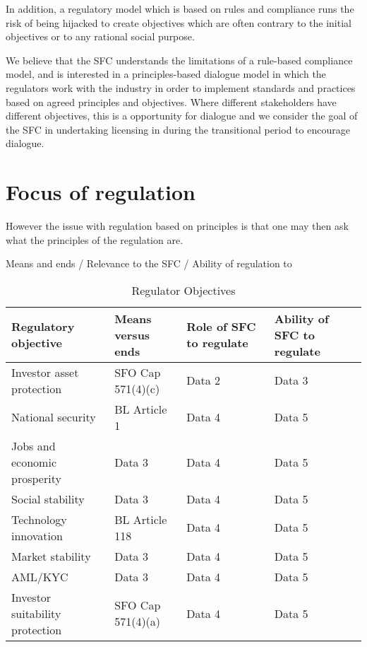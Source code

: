 In addition, a regulatory model which is based on rules and compliance
runs the risk of being hijacked to create objectives which are often
contrary to the initial objectives or to any rational social purpose.

We believe that the SFC understands the limitations of a rule-based
compliance model, and is interested in a principles-based dialogue
model in which the regulators work with the industry in order to
implement standards and practices based on agreed principles and
objectives.  Where different stakeholders have different objectives,
this is a opportunity for dialogue and we consider the goal of the SFC
in undertaking licensing in during the transitional period to
encourage dialogue.


\section{Focus of regulation}

However the issue with regulation based on principles is that one may
then ask what the principles of the regulation are.


Means and ends / Relevance to the SFC / Ability of regulation to 
\begin{landscape}
\thispagestyle{empty} %

\begin{table}[htbp]
  \centering
  \caption{Regulator Objectives}
  \begin{tabularx}{\linewidth}{|X|X|X|X|}
    \hline
    \textbf{Regulatory objective} & \textbf{Means versus ends} & \textbf{Role of SFC to regulate} & \textbf{Ability of SFC to regulate} \\
    \hline
    Investor asset protection & SFO Cap 571(4)(c) & Data 2 & Data 3 \\
    \hline
    National security & BL Article 1 & Data 4  & Data 5\\
    \hline
    Jobs and economic prosperity & Data 3 & Data 4  & Data 5\\
    \hline
    Social stability & Data 3 & Data 4  & Data 5\\
    \hline
    Technology innovation & BL Article 118 & Data 4  & Data 5\\
    \hline
    Market stability & Data 3 & Data 4  & Data 5\\
    \hline
    AML/KYC & Data 3 & Data 4  & Data 5\\
    \hline
    Investor suitability protection & SFO Cap 571(4)(a) & Data 4  & Data 5\\
  \end{tabularx}
\end{table}

\end{landscape}

